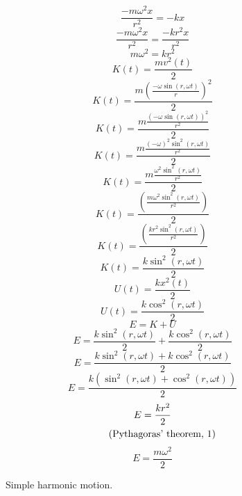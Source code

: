\documentclass[a4paper,12pt]{report}
\newcommand{\equationnote}[1]{%
    \refstepcounter{equation}%
    \tag{#1, \theequation}%
}
\begin{document}
\begin{equation}
\frac{-m \omega^2 x}{r^2} = -kx
\end{equation}
\begin{equation}
\frac{-m \omega^2 x}{r^2} = \frac{-kr^2x}{r^2}
\end{equation}
\begin{equation}
m \omega^2 = kr^2
\end{equation}
\begin{equation}
K(t) = \frac{mv^2(t)}{2}
\end{equation}
\begin{equation}
K(t) = \frac{m \left(\frac{-\omega \sin(r,\omega t)}{r}\right)^2}{2}
\end{equation}
\begin{equation}
K(t) = \frac{m \frac{(-\omega \sin(r,\omega t))^2}{r^2}}{2}
\end{equation}
\begin{equation}
K(t) = \frac{m \frac{(-\omega)^2 \sin^2(r,\omega t)}{r^2}}{2}
\end{equation}
\begin{equation}
K(t) = \frac{m \frac{\omega^2 \sin^2(r,\omega t)}{r^2}}{2}
\end{equation}
\begin{equation}
K(t) = \frac{\left(\frac{m \omega^2 \sin^2(r,\omega t)}{r^2}\right)}{2}
\end{equation}
\begin{equation}
K(t) = \frac{\left(\frac{kr^2 \sin^2(r,\omega t)}{r^2}\right)}{2}
\end{equation}
\begin{equation}
K(t) = \frac{k \sin^2(r,\omega t)}{2}
\end{equation}
\begin{equation}
U(t) = \frac{kx^2(t)}{2}
\end{equation}
\begin{equation}
U(t) = \frac{k \cos^2(r,\omega t)}{2}
\end{equation}
\begin{equation}
E = K + U
\end{equation}
\begin{equation}
E = \frac{k \sin^2(r,\omega t)}{2} + \frac{k \cos^2(r,\omega t)}{2}
\end{equation}
\begin{equation}
E = \frac{k \sin^2(r,\omega t) + k \cos^2(r,\omega t)}{2}
\end{equation}
\begin{equation}
E = \frac{k (\sin^2(r,\omega t) + \cos^2(r,\omega t))}{2}
\end{equation}
\begin{gather}
E = \frac{kr^2}{2} \notag \\
\equationnote{Pythagoras' theorem}
\end{gather}
\begin{equation}
E = \frac{m \omega^2}{2}
\end{equation}
\clearpage
\begin{figure}[p]
\centering
\resizebox{\textwidth}{!}{}
\caption{Simple harmonic motion.}
\end{figure}
\clearpage
\end{document}
